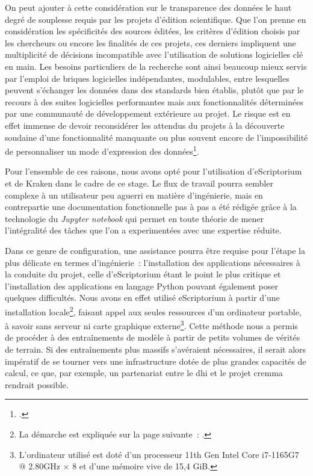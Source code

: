 \documentclass[a4paper,12pt,twoside]{book}
\begin{document}
			On peut ajouter à cette considération sur le transparence des données le haut degré de souplesse requis par les projets d'édition scientifique. Que l'on prenne en considération les spécificités des sources éditées, les critères d'édition choisis par les chercheurs ou encore les finalités de ces projets, ces derniers impliquent une multiplicité de décisions incompatible avec l'utilisation de solutions logicielles clé en main. Les besoins particuliers de la recherche sont ainsi beaucoup mieux servis par l'emploi de briques logicielles indépendantes, modulables, entre lesquelles peuvent s'échanger les données dans des standards bien établis, plutôt que par le recours à des suites logicielles performantes mais aux fonctionnalités déterminées par une communauté de développement extérieure au projet. Le risque est en effet immense de devoir reconsidérer les attendus du projets à la découverte soudaine d'une fonctionnalité manquante ou plus souvent encore de l'impossibilité de personnaliser un mode d'expression des données\footcite{stokesEScriptoriumVREManuscript2021}.
			
			Pour l'ensemble de ces raisons, nous avons opté pour l'utilisation d'eScriptorium et de Kraken dans le cadre de ce stage. Le flux de travail pourra sembler complexe à un utilisateur peu aguerri en matière d'ingénierie, mais en contrepartie une documentation fonctionnelle pas à pas a été rédigée grâce à la technologie du \textit{Jupyter notebook} qui permet en toute théorie de mener l'intégralité des tâches que l'on a experimentées avec une expertise réduite.
						
			Dans ce genre de configuration, une assistance pourra être requise pour l'étape la plus délicate en termes d'ingénierie~: l'installation des applications nécessaires à la conduite du projet, celle d'eScriptorium étant le point le plus critique et l'installation des applications en langage Python pouvant également poser quelques difficultés. Nous avons en effet utilisé eScriptorium à partir d'une installation locale\footnote{La démarche est expliquée sur la page suivante~: \cite{DockerInstallInstallation}.}, faisant appel aux seules ressources d'un ordinateur portable, à savoir sans serveur ni carte graphique externe\footnote{L'ordinateur utilisé est doté d'un processeur 11th Gen Intel Core i7-1165G7 @ 2.80GHz × 8 et d'une mémoire vive de 15,4 GiB.}. Cette méthode nous a permis de procéder à des entraînements de modèle à partir de petits volumes de vérités de terrain. Si des entraînements plus massifs s'avéraient nécessaires, il serait alors impératif de se tourner vers une infrastructure dotée de plus grandes capacités de calcul, ce que, par exemple, un partenariat entre le \gls{dhi} et le projet \gls{cremma} rendrait possible.
						
\end{document}
